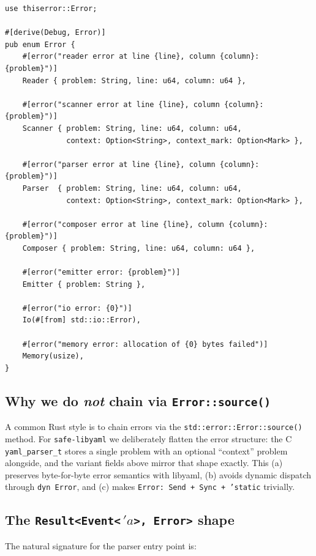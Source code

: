 \documentclass[12pt]{article}
\theoremstyle{definition}
\theoremstyle{remark}
\newcommand{\lifetime}[1]{\ensuremath{\,'\!#1}}
\begin{document}
\begin{lstlisting}
use thiserror::Error;

#[derive(Debug, Error)]
pub enum Error {
    #[error("reader error at line {line}, column {column}: {problem}")]
    Reader { problem: String, line: u64, column: u64 },

    #[error("scanner error at line {line}, column {column}: {problem}")]
    Scanner { problem: String, line: u64, column: u64,
              context: Option<String>, context_mark: Option<Mark> },

    #[error("parser error at line {line}, column {column}: {problem}")]
    Parser  { problem: String, line: u64, column: u64,
              context: Option<String>, context_mark: Option<Mark> },

    #[error("composer error at line {line}, column {column}: {problem}")]
    Composer { problem: String, line: u64, column: u64 },

    #[error("emitter error: {problem}")]
    Emitter { problem: String },

    #[error("io error: {0}")]
    Io(#[from] std::io::Error),

    #[error("memory error: allocation of {0} bytes failed")]
    Memory(usize),
}
\end{lstlisting}

\subsection{Why we do \emph{not} chain via \texttt{Error::source()}}

A common Rust style is to chain errors via the \texttt{std::error::Error::source()}
method. For \texttt{safe-libyaml} we deliberately flatten the error structure:
the C \texttt{yaml\_parser\_t} stores a single problem with an optional
``context'' problem alongside, and the variant fields above mirror that shape
exactly. This (a) preserves byte-for-byte error semantics with libyaml,
(b) avoids dynamic dispatch through \texttt{dyn Error}, and (c) makes
\texttt{Error: Send + Sync + 'static} trivially.

\subsection{\texorpdfstring{The \texttt{Result<Event<\lifetime{a}>, Error>} shape}{The Result<Event<'a>, Error> shape}}

The natural signature for the parser entry point is:
\end{document}
